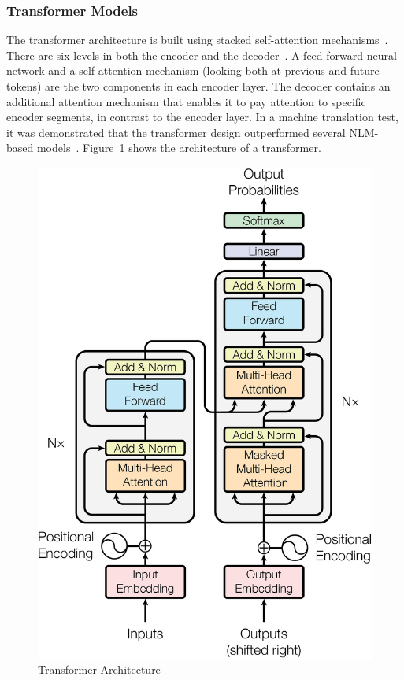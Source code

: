 

\subsubsection{Transformer Models}
The transformer architecture is built using stacked self-attention mechanisms~\cite{attention}. There are six levels in both the encoder and the decoder~\cite{attention}. 
A feed-forward neural network and a self-attention mechanism (looking both at previous and future tokens) are the two components in each encoder layer. The decoder contains an additional attention mechanism that enables it to pay attention to specific encoder segments, in contrast to the encoder layer. 
In a machine translation test, it was demonstrated that the transformer design outperformed several NLM-based models~\cite{attention}. Figure~\ref{fig:transformer} shows the architecture of a transformer.

\begin{figure}[hbt!]
    \centering
    \includegraphics[width=.4\linewidth]{Figures/transformer.png}
    \caption{Transformer Architecture~\cite{attention}}
    \label{fig:transformer}
\end{figure}

